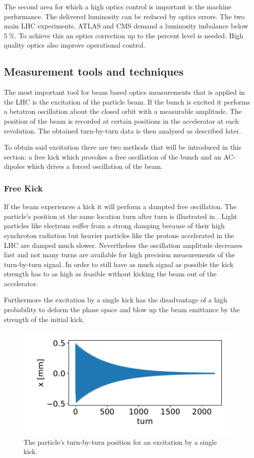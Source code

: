 The second area for which a high optics control is important is the machine performance.
The delivered luminosity can be reduced by optics errors.
The two main LHC experiments, ATLAS and CMS demand a luminosity imbalance below $\SI{5}{\percent}$.
To achieve this an optics correction up to the percent level is needed.
High quality optics also improve operational control.

\subsection{Measurement tools and techniques}

The most important tool for beam based optics measurements that is applied in the LHC is the excitation
of the particle beam.
If the bunch is excited it performs a betatron oscillation about the closed orbit with a measurable amplitude.
The position of the beam is recorded at certain positions in the accelerator at each revolution. The
obtained turn-by-turn data is then analysed as described later.

To obtain said excitation there are two methods that will be introduced in this section: a free kick
which provokes a free oscillation of the bunch and an AC-dipoles which drives a forced oscillation of
the beam. 

\subsubsection{Free Kick}

If the beam experiences a kick it will perform a dampted free oscillation.
The particle's position at the same location turn after turn is illustrated in .
Light particles like electrons
suffer from a strong damping because of their high synchroton radiation but heavier particles like the
protons accelerated in the LHC are damped much slower.
Nevertheless the oscillation amplitude decreases fast and not many turns are available for high
precision measurements of the turn-by-turn signal. In order to still have as much signal as possible
the kick strength has to as high as feasible without kicking the beam out of the accelerator.

Furthermore the excitation by a single kick has the disadvantage of a high probability to deform the
phase space and blow up the beam emittance by the strength of the initial kick. 

\begin{figure}[h]
    \centering
    \includegraphics[width=.8\linewidth]{kick_plot.pdf}  
    \caption{The particle's turn-by-turn position for an excitation by a single kick.}
    \label{fig_kick_plot}
\end{figure}

